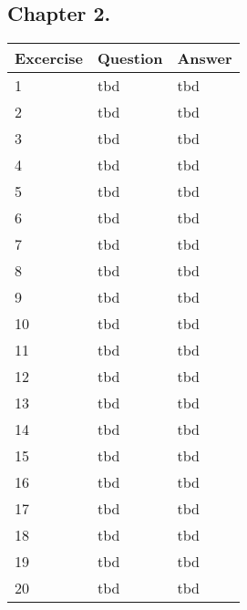 \subsection*{Chapter 2.}
\begin{tabular}{|l|l|l|}
    \hline
    \rowcolor[HTML]{EFEFEF}
    {\color[HTML]{000000} Excercise } & {\color[HTML]{000000} Question } & {\color[HTML]{000000} Answer } \\ \hline
    1 & tbd & tbd \\ \hline
    2 & tbd & tbd \\ \hline
    3 & tbd & tbd \\ \hline
    4 & tbd & tbd \\ \hline
    5 & tbd & tbd \\ \hline
    6 & tbd & tbd \\ \hline
    7 & tbd & tbd \\ \hline
    8 & tbd & tbd \\ \hline
    9 & tbd & tbd \\ \hline
    10 & tbd & tbd \\ \hline
    11 & tbd & tbd \\ \hline
    12 & tbd & tbd \\ \hline
    13 & tbd & tbd \\ \hline
    14 & tbd & tbd \\ \hline
    15 & tbd & tbd \\ \hline
    16 & tbd & tbd \\ \hline
    17 & tbd & tbd \\ \hline
    18 & tbd & tbd \\ \hline
    19 & tbd & tbd \\ \hline
    20 & tbd & tbd \\ \hline
\end{tabular}
